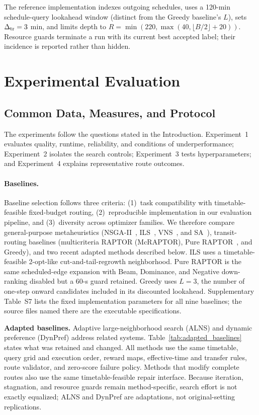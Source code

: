 The reference implementation indexes outgoing schedules, uses a 120-min
schedule-query lookahead window (distinct from the Greedy baseline's \(L\)),
sets \(\Delta_{\rm tr}=3\) min, and limits depth to
\(R=\min(220,\max(40,\lfloor B/2\rfloor+20))\). Resource guards terminate a
run with its current best accepted label; their incidence is reported rather
than hidden.

\section{Experimental Evaluation}
\subsection{Common Data, Measures, and Protocol}
The experiments follow the questions stated in the Introduction. Experiment~1
evaluates quality, runtime, reliability, and conditions of underperformance;
Experiment~2 isolates the search controls; Experiment~3 tests
hyperparameters; and Experiment~4 explains representative route outcomes.

\paragraph{Baselines.}
Baseline selection follows three criteria: (1)~task compatibility with
timetable-feasible fixed-budget routing, (2)~reproducible implementation
in our evaluation pipeline, and (3)~diversity across optimizer families.
We therefore compare general-purpose metaheuristics (NSGA-II~\cite{deb2002nsga2},
ILS~\cite{lourenco2003ils}, VNS~\cite{mladenovic1997vns}, and
SA~\cite{kirkpatrick1983sa}), transit-routing baselines (multicriteria RAPTOR
(McRAPTOR), Pure RAPTOR~\cite{delling2015raptor}, and Greedy), and two recent
adapted methods described below. ILS uses a timetable-feasible 2-opt-like
cut-and-tail-regrowth neighborhood. Pure RAPTOR is the same scheduled-edge
expansion with Beam, Dominance, and Negative down-ranking disabled but a 60-s
guard retained. Greedy uses \(L=3\), the number of one-step onward candidates
included in its discounted lookahead.
Supplementary Table~S7 lists the fixed implementation parameters for all nine
baselines; the source files named there are the executable specifications.

\textbf{Adapted baselines.}
Adaptive large-neighborhood search (ALNS) and dynamic preference (DynPref)
address related systems. Table~\ref{tab:adapted_baselines} states what was
retained and changed. All methods use the same timetable, query grid and
execution order, reward maps, effective-time and transfer rules, route validator, and
zero-score failure policy. Methods that modify complete routes also use the
same timetable-feasible repair interface. Because iteration, stagnation, and
resource guards remain method-specific, search effort is not exactly equalized;
ALNS and DynPref are adaptations, not original-setting replications.

